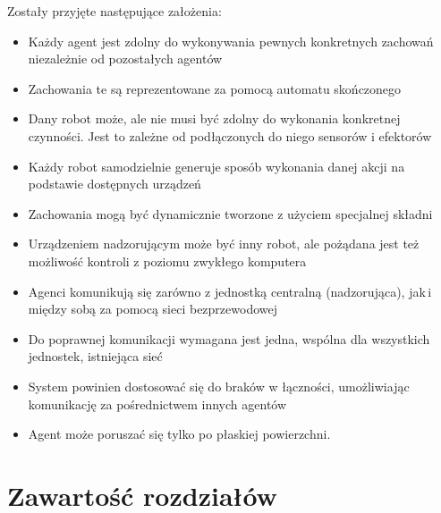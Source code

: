 Zostały przyjęte następujące założenia:
\begin{itemize}
  \item Każdy agent jest zdolny do wykonywania pewnych konkretnych zachowań niezależnie od pozostałych agentów
  \item Zachowania te są reprezentowane za pomocą automatu skończonego
  \item Dany robot może, ale nie musi być zdolny do wykonania konkretnej czynności. Jest to zależne od podłączonych do niego sensorów i efektorów
  \item Każdy robot samodzielnie generuje sposób wykonania danej akcji na podstawie dostępnych urządzeń
  \item Zachowania mogą być dynamicznie tworzone z użyciem specjalnej składni
  \item Urządzeniem nadzorującym może być inny robot, ale pożądana jest też możliwość kontroli z poziomu zwykłego komputera
  \item Agenci komunikują się zarówno z jednostką centralną (nadzorująca), jak\,i między sobą za pomocą sieci bezprzewodowej
  \item Do poprawnej komunikacji wymagana jest jedna, wspólna dla wszystkich jednostek, istniejąca sieć
  \item System powinien dostosować się do braków w łączności, umożliwiając komunikację za pośrednictwem innych agentów
  \item Agent może poruszać się tylko po płaskiej powierzchni.
\end{itemize}


\section{Zawartość rozdziałów}

